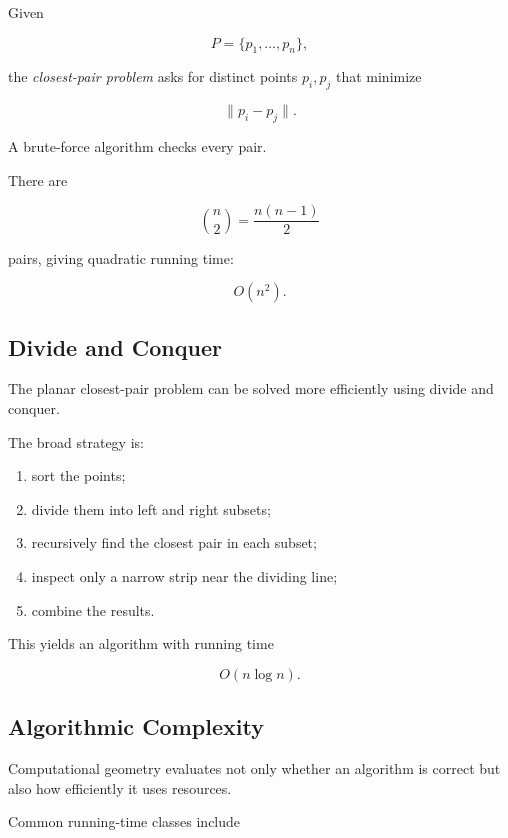 Given

\[
P=\{p_1,\ldots,p_n\},
\]

the \emph{closest-pair problem} asks for distinct points \(p_i,p_j\) that
minimize

\[
\boxed{
\|p_i-p_j\|.
}
\]

A brute-force algorithm checks every pair.

There are

\[
\binom{n}{2}
=
\frac{n(n-1)}{2}
\]

pairs, giving quadratic running time:

\[
\boxed{
O(n^2).
}
\]

\subsection{Divide and Conquer}
\label{subsec:closest-pair-divide-conquer}

The planar closest-pair problem can be solved more efficiently using
divide and conquer.

The broad strategy is:

\begin{enumerate}
    \item sort the points;
    \item divide them into left and right subsets;
    \item recursively find the closest pair in each subset;
    \item inspect only a narrow strip near the dividing line;
    \item combine the results.
\end{enumerate}

This yields an algorithm with running time

\[
\boxed{
O(n\log n).
}
\]

\subsection{Algorithmic Complexity}
\label{subsec:geometry-algorithmic-complexity}

Computational geometry evaluates not only whether an algorithm is correct
but also how efficiently it uses resources.

Common running-time classes include

